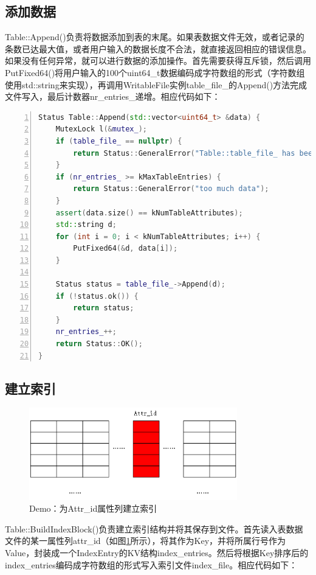 \documentclass[bachelor]{thesis-uestc}
\begin{document}
\subsection{添加数据}
Table::Append()负责将数据添加到表的末尾。如果表数据文件无效，或者记录的条数已达最大值，或者用户输入的数据长度不合法，就直接返回相应的错误信息。如果没有任何异常，就可以进行数据的添加操作。首先需要获得互斥锁，然后调用PutFixed64()将用户输入的100个uint64\_t数据编码成字符数组的形式（字符数组使用std::string来实现），再调用WritableFile实例table\_file\_的Append()方法完成文件写入，最后计数器nr\_entries\_递增。相应代码如下：

\begin{lstlisting}[language=C++, basicstyle=\ttfamily\tiny, numbers=left, numberstyle=\tiny, keywordstyle=\color{blue!70}, commentstyle=\color{red!50!green!50!blue!50}, frame=shadowbox, rulesepcolor=\color{red!20!green!20!blue!20}]
Status Table::Append(std::vector<uint64_t> &data) {
	MutexLock l(&mutex_);
	if (table_file_ == nullptr) {
		return Status::GeneralError("Table::table_file_ has been closed.");
	}
	if (nr_entries_ >= kMaxTableEntries) {
		return Status::GeneralError("too much data");
	}
	assert(data.size() == kNumTableAttributes);
	std::string d;
	for (int i = 0; i < kNumTableAttributes; i++) {
		PutFixed64(&d, data[i]);
	}
	
	Status status = table_file_->Append(d);
	if (!status.ok()) {
		return status;
	}
	nr_entries_++;
	return Status::OK();
}
\end{lstlisting}

\subsection{建立索引}
\begin{figure}[htbp]
	\centering\includegraphics[height=4cm]{images/index_demo.png}
	\caption{Demo：为Attr\_id属性列建立索引}
	\label{fig:index_demo}
\end{figure}

Table::BuildIndexBlock()负责建立索引结构并将其保存到文件。首先读入表数据文件的某一属性列attr\_id（如图\ref{fig:index_demo}所示），将其作为Key，并将所属行号作为Value，封装成一个IndexEntry的KV结构index\_entries。然后将根据Key排序后的index\_entries编码成字符数组的形式写入索引文件index\_file。相应代码如下：
\end{document}
